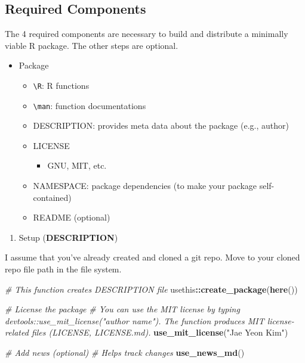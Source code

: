 \documentclass[
]{book}
\newenvironment{Shaded}{\begin{snugshade}}{\end{snugshade}}
\newcommand{\CommentTok}[1]{\textcolor[rgb]{0.56,0.35,0.01}{\textit{#1}}}
\newcommand{\FunctionTok}[1]{\textcolor[rgb]{0.13,0.29,0.53}{\textbf{#1}}}
\newcommand{\NormalTok}[1]{#1}
\newcommand{\SpecialCharTok}[1]{\textcolor[rgb]{0.81,0.36,0.00}{\textbf{#1}}}
\newcommand{\StringTok}[1]{\textcolor[rgb]{0.31,0.60,0.02}{#1}}
\providecommand{\tightlist}{%
  \setlength{\itemsep}{0pt}\setlength{\parskip}{0pt}}
\begin{document}
\subsection{Required Components}\label{required-components}

The 4 required components are necessary to build and distribute a minimally viable R package. The other steps are optional.

\begin{itemize}
\tightlist
\item
  Package

  \begin{itemize}
  \tightlist
  \item
    \texttt{\textbackslash{}R}: R functions
  \item
    \texttt{\textbackslash{}man}: function documentations
  \item
    DESCRIPTION: provides meta data about the package (e.g., author)
  \item
    LICENSE

    \begin{itemize}
    \tightlist
    \item
      GNU, MIT, etc.
    \end{itemize}
  \item
    NAMESPACE: package dependencies (to make your package self-contained)
  \item
    README (optional)
  \end{itemize}
\end{itemize}

\begin{enumerate}
\def\labelenumi{\arabic{enumi}.}
\tightlist
\item
  Setup (\textbf{DESCRIPTION})
\end{enumerate}

I assume that you've already created and cloned a git repo. Move to your cloned repo file path in the file system.

\begin{Shaded}
\begin{Highlighting}[]
\CommentTok{\# This function creates DESCRIPTION file }
\NormalTok{usethis}\SpecialCharTok{::}\FunctionTok{create\_package}\NormalTok{(}\FunctionTok{here}\NormalTok{())}

\CommentTok{\# License the package }
\CommentTok{\# You can use the MIT license by typing devtools::use\_mit\_license("author name"). The function produces MIT license{-}related files (LICENSE, LICENSE.md).}
\FunctionTok{use\_mit\_license}\NormalTok{(}\StringTok{"Jae Yeon Kim"}\NormalTok{)}

\CommentTok{\# Add news (optional) }
\CommentTok{\# Helps track changes }
\FunctionTok{use\_news\_md}\NormalTok{() }
\end{Highlighting}
\end{Shaded}
\end{document}
